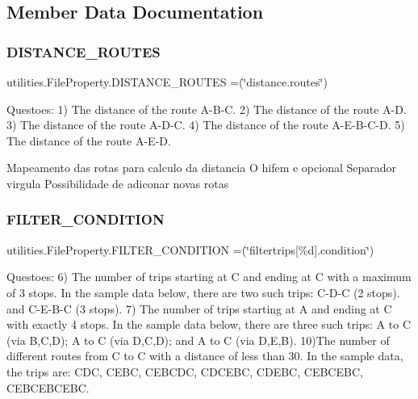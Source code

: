 \subsection{Member Data Documentation}
\mbox{\label{enumutilities_1_1_file_property_a4d85ea554068d0cfe0de81567126cda1}} 
\subsubsection{\texorpdfstring{D\+I\+S\+T\+A\+N\+C\+E\+\_\+\+R\+O\+U\+T\+ES}{DISTANCE\_ROUTES}}
{\footnotesize\ttfamily utilities.\+File\+Property.\+D\+I\+S\+T\+A\+N\+C\+E\+\_\+\+R\+O\+U\+T\+ES =(\char`\"{}distance.\+routes\char`\"{})}

Questoes\+: 1) The distance of the route A-\/\+B-\/C. 2) The distance of the route A-\/D. 3) The distance of the route A-\/\+D-\/C. 4) The distance of the route A-\/\+E-\/\+B-\/\+C-\/D. 5) The distance of the route A-\/\+E-\/D.

Mapeamento das rotas para calculo da distancia O hifem e opcional Separador virgula Possibilidade de adiconar novas rotas \mbox{\label{enumutilities_1_1_file_property_afc45daab73cc6bec29b8c3cb399efa83}} 
\subsubsection{\texorpdfstring{F\+I\+L\+T\+E\+R\+\_\+\+C\+O\+N\+D\+I\+T\+I\+ON}{FILTER\_CONDITION}}
{\footnotesize\ttfamily utilities.\+File\+Property.\+F\+I\+L\+T\+E\+R\+\_\+\+C\+O\+N\+D\+I\+T\+I\+ON =(\char`\"{}filtertrips\mbox{[}\%d\mbox{]}.condition\char`\"{})}

Questoes\+: 6) The number of trips starting at C and ending at C with a maximum of 3 stops. In the sample data below, there are two such trips\+: C-\/\+D-\/C (2 stops). and C-\/\+E-\/\+B-\/C (3 stops). 7) The number of trips starting at A and ending at C with exactly 4 stops. In the sample data below, there are three such trips\+: A to C (via B,C,D); A to C (via D,C,D); and A to C (via D,E,B). 10)The number of different routes from C to C with a distance of less than 30. In the sample data, the trips are\+: C\+DC, C\+E\+BC, C\+E\+B\+C\+DC, C\+D\+C\+E\+BC, C\+D\+E\+BC, C\+E\+B\+C\+E\+BC, C\+E\+B\+C\+E\+B\+C\+E\+BC.

